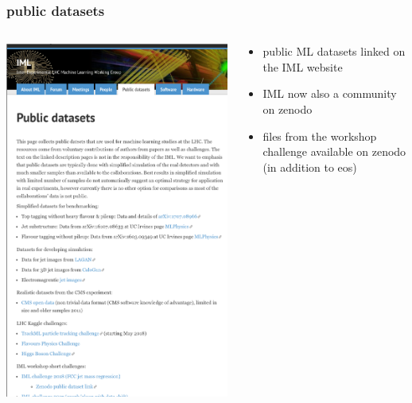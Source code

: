 \begin{frame}
  \frametitle{public datasets}

  \begin{columns}
    \begin{column}{.5\textwidth}
      \includegraphics[width=\textwidth]{./data.png}
    \end{column}
    \begin{column}{.5\textwidth}
      \begin{itemize}
          \item public ML datasets linked on the IML website
          \item IML now also a community on zenodo
          \item files from the workshop challenge available on zenodo \newline (in addition to eos)
      \end{itemize}
    \end{column}
  \end{columns}
\end{frame}

